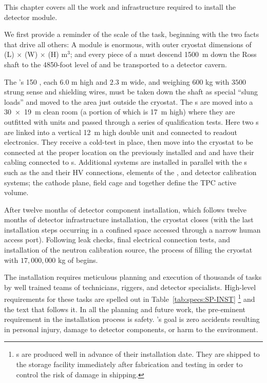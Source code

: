 
This chapter covers all the work and infrastructure required to install the  detector module. 
 
We first provide a reminder of the scale of the task, beginning with the two facts that drive all others: A   module is enormous, with outer cryostat dimensions  of 
\cryostatlen{}(L) $\times$ \cryostatwdth{}(W) $\times$ \cryostatht{}(H) m$^{3}$; 
and every piece of a  must descend 
\SI{1500}{m} down the Ross shaft to the 4850-foot level of  and be transported to a detector cavern.


The 's 150 , each $6.0$ m high and $2.3$ m wide, and  weighing $600$ kg with $3500$ strung sense and shielding wires, must be taken down the shaft as special ``slung loads'' and moved to the area just outside the  cryostat. 
The s are moved into a \SI{30 x 19}{m} clean room (a portion of which is \SI{17}{m} high) where they are outfitted  with  units and passed through a series of qualification tests.
Here two s are linked into a vertical \SI{12}{m} high double unit and connected to readout electronics. 
They receive a cold-test in place, then move into the cryostat to be connected at the proper location on the previously installed  and and have their cabling connected to \fdth{}s. 
Additional systems are installed in parallel with the s such as the  and their HV connections, elements of the , and detector calibration systems; the cathode plane, field cage and  together define the TPC active volume.


After twelve months of detector component installation, which follows twelve months of detector infrastructure installation, the cryostat closes (with the last installation steps occurring in a confined space accessed through a narrow human access port). 
Following leak checks, final electrical connection tests, and installation of the neutron calibration source, the process of filling the cryostat with $17,000,000$ kg of  begins.

The installation requires meticulous planning and execution of thousands of tasks by well trained teams of technicians, riggers, and detector specialists. 
High-level requirements for these tasks are spelled out in Table~\ref{tab:specs:SP-INST}
\footnote{s are produced well in advance of their installation date. They are shipped to the storage facility immediately after fabrication and testing in order to control the risk of damage in shipping.} 
and the text that follows it. 
In all the planning and future work, the pre-eminent requirement in the installation process is safety.
's goal is zero accidents resulting in personal injury, damage to detector components, or harm to the environment.


